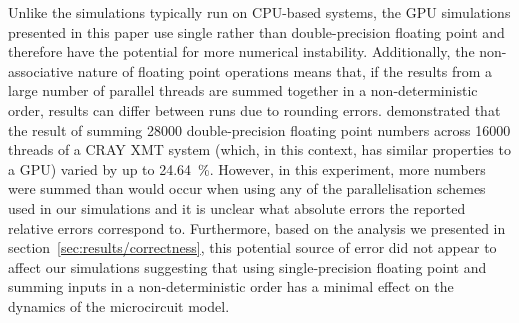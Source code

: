\documentclass[utf8]{frontiersSCNS} %
\begin{document}
Unlike the simulations typically run on CPU-based systems, the GPU simulations presented in this paper use single rather than double-precision floating point and therefore have the potential for more numerical instability.
Additionally, the non-associative nature of floating point operations means that, if the results from a large number of parallel threads are summed together in a non-deterministic order, results can differ between runs due to rounding errors.
\citet{Villa2009} demonstrated that the result of summing \num{28000} double-precision floating point numbers across \num{16000} threads of a CRAY XMT system (which, in this context, has similar properties to a GPU) varied by up to \SI{24.64}{\percent}.
However, in this experiment, more numbers were summed than would occur when using any of the parallelisation schemes used in our simulations and it is unclear what absolute errors the reported relative errors correspond to. 
Furthermore, based on the analysis we presented in section~\ref{sec:results/correctness}, this potential source of error did not appear to affect our simulations suggesting that using single-precision floating point and summing inputs in a non-deterministic order has a minimal effect on the dynamics of the microcircuit model.
\end{document}
